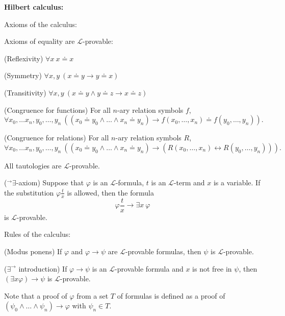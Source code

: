 \documentclass[a4paper, 11pt]{amsart}
\theoremstyle{remark}
\newcommand{\cL}{\mathcal L}
\newenvironment{enumerate-(a)}{\begin{enumerate}[label={\upshape (\alph*)}, leftmargin=2pc]}{\end{enumerate}}
\newenvironment{enumerate-(1)}{\begin{enumerate}[label={\upshape (\arabic*)}, leftmargin=2pc]}{\end{enumerate}}
\begin{document}
\noindent 
{\bf Hilbert calculus:} 

\medskip 
\noindent 
Axioms of the calculus: 

\begin{enumerate-(1)} 
\item 
Axioms of equality are $\cL$-provable: 
\begin{enumerate-(a)} 
\item 
(Reflexivity) 
$\forall x\ x\doteq x$ 
\item 
(Symmetry) 
$\forall x,y\ (x\doteq y \rightarrow y\doteq x) $ 
\item 
(Transitivity) 
$\forall x,y\ (x\doteq y\wedge y\doteq z \rightarrow x\doteq z)$ 
\item 
(Congruence for functions) 
For all $n$-ary relation symbols $f$, 
$$\forall x_0,\dots x_n, y_0,\dots,y_n\ ((x_0\doteq y_0\wedge \dots \wedge x_n\doteq y_n) \rightarrow f(x_0,\dots,x_n) \doteq f(y_0,\dots,y_n)).$$ 
\item 
(Congruence for relations) 
For all $n$-ary relation symbols $R$, 
$$\forall x_0,\dots x_n, y_0,\dots,y_n\ ((x_0\doteq y_0\wedge \dots \wedge x_n\doteq y_n) \rightarrow (R(x_0,\dots,x_n) \leftrightarrow R(y_0,\dots,y_n))).$$ 
\end{enumerate-(a)} 

\item 
All tautologies are $\cL$-provable. 
\item 
(${}^\rightarrow\exists$-axiom) 
Suppose that $\varphi$ is an $\cL$-formula, $t$ is an $\cL$-term and $x$ is a variable.
 If the substitution $ \varphi \frac{t}{x}$ is allowed, then the formula 
$$ \varphi \frac{t}{x} \rightarrow \exists x\ \varphi$$ 
is $\cL$-provable. 
\end{enumerate-(1)} 

\medskip 
\noindent 
Rules of the calculus: 

\begin{enumerate-(1)} 
\item 
(Modus ponens) 
If $\varphi$ and $\varphi\rightarrow \psi$ are $\cL$-provable formulas, then $\psi$ is $\cL$-provable. 

\item 
($\exists^\rightarrow$ introduction) 
If $\varphi\rightarrow \psi$ is an $\cL$-provable formula and $x$ is not free in $\psi$, then $(\exists x \varphi) \rightarrow \psi$ is $\cL$-provable. 
\end{enumerate-(1)} 


\bigskip 

Note that a proof of $\varphi$ from a set $T$ of formulas is defined as a proof of $(\psi_0\wedge \dots \wedge \psi_n)\rightarrow \varphi$ with $\psi_n\in T$. 
\end{document}
